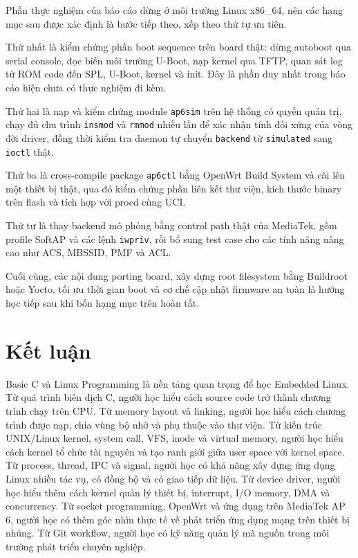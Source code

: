 \documentclass[11pt]{article}
\newcommand{\code}[1]{\texttt{#1}}
\begin{document}
Phần thực nghiệm của báo cáo dừng ở môi trường Linux x86\_64, nên các hạng mục sau được xác định là bước tiếp theo, xếp theo thứ tự ưu tiên.

Thứ nhất là kiểm chứng phần boot sequence trên board thật: dừng autoboot qua serial console, đọc biến môi trường U-Boot, nạp kernel qua TFTP, quan sát log từ ROM code đến SPL, U-Boot, kernel và init. Đây là phần duy nhất trong báo cáo hiện chưa có thực nghiệm đi kèm.

Thứ hai là nạp và kiểm chứng module \code{ap6sim} trên hệ thống có quyền quản trị, chạy đủ chu trình \code{insmod} và \code{rmmod} nhiều lần để xác nhận tính đối xứng của vòng đời driver, đồng thời kiểm tra daemon tự chuyển \code{backend} từ \code{simulated} sang \code{ioctl} thật.

Thứ ba là cross-compile package \code{ap6ctl} bằng OpenWrt Build System và cài lên một thiết bị thật, qua đó kiểm chứng phần liên kết thư viện, kích thước binary trên flash và tích hợp với procd cùng UCI.

Thứ tư là thay backend mô phỏng bằng control path thật của MediaTek, gồm profile SoftAP và các lệnh \code{iwpriv}, rồi bổ sung test case cho các tính năng nâng cao như ACS, MBSSID, PMF và ACL.

Cuối cùng, các nội dung porting board, xây dựng root filesystem bằng Buildroot hoặc Yocto, tối ưu thời gian boot và cơ chế cập nhật firmware an toàn là hướng học tiếp sau khi bốn hạng mục trên hoàn tất.

\section{Kết luận}

Basic C và Linux Programming là nền tảng quan trọng để học Embedded Linux. Từ quá trình biên dịch C, người học hiểu cách source code trở thành chương trình chạy trên CPU. Từ memory layout và linking, người học hiểu cách chương trình được nạp, chia vùng bộ nhớ và phụ thuộc vào thư viện. Từ kiến trúc UNIX/Linux kernel, system call, VFS, inode và virtual memory, người học hiểu cách kernel tổ chức tài nguyên và tạo ranh giới giữa user space với kernel space. Từ process, thread, IPC và signal, người học có khả năng xây dựng ứng dụng Linux nhiều tác vụ, có đồng bộ và có giao tiếp dữ liệu. Từ device driver, người học hiểu thêm cách kernel quản lý thiết bị, interrupt, I/O memory, DMA và concurrency. Từ socket programming, OpenWrt và ứng dụng trên MediaTek AP 6, người học có thêm góc nhìn thực tế về phát triển ứng dụng mạng trên thiết bị nhúng. Từ Git workflow, người học có kỹ năng quản lý mã nguồn trong môi trường phát triển chuyên nghiệp.
\end{document}
